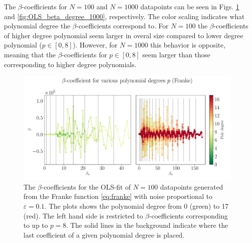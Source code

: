 \documentclass[%
reprint,
amsmath,amssymb,
aps,
pra,
]{revtex4-2}
\begin{document}
The \(\beta\)-coefficients for \(N=100\) and \(N=1000\) datapoints can be seen in Figs. \ref{fig:OLS_beta_degree_100} and \ref{fig:OLS_beta_degree_1000}, respectively. The color scaling indicates what polynomial degree the \(\beta\)-coefficients correspond to. For \(N=100\) the \(\beta\)-coefficients of higher degree polynomial seem larger in overal size compared to lower degree polynomial (\(p\in[0,8]\)). However, for \(N=1000\) this behavior is opposite, meaning that the \(\beta\)-coefficients for \(p\in[0,8]\) seem larger than those corresponding to higher degree polynomials.

\begin{figure}[H]
	\hspace{-7.5mm}
	\includegraphics[width=1.15\linewidth]{Python/Figures/OLS/OLS_betano_scaling_100.pdf}
	\caption{The \(\beta\)-coefficients for the OLS-fit of \(N=100\) datapoints generated from the Franke function \eqref{eq:franke} with noise proportional to \(\varepsilon=0.1\). The plots shows the polynomial degree from 0 (green) to 17 (red). The left hand side is restricted to \(\beta\)-coefficients corresponding to up to \(p=8\). The solid lines in the background indicate where the last coefficient of a given polynomial degree is placed.}
	\label{fig:OLS_beta_degree_100}
\end{figure}
\end{document}
